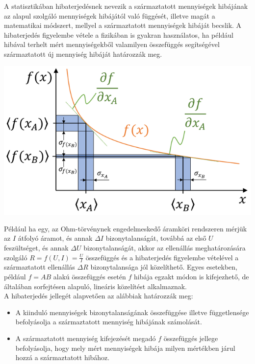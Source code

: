 \documentclass[11pt,a4paper]{article}
\begin{document}
  \begin{tcolorbox}[colback=MidnightBlue!5!white,colframe=MidnightBlue!60!black,title= Hibaterjedés]
    \begin{multicols*}{2}
        A statisztikában hibaterjedésnek nevezik a származtatott mennyiségek hibájának az alapul szolgáló mennyiségek hibájától való függését, illetve magát a matematikai módszert, mellyel a származtatott mennyiségek hibáját becslik. A hibaterjedés figyelembe vétele a fizikában is gyakran használatos, ha például hibával terhelt mért mennyiségekből valamilyen összefüggés segítségével származtatott új mennyiség hibáját határozzák meg.
        \columnbreak
        \begin{center}
            \includegraphics*[width=.4\textwidth]{hibaterjedes.png}
        \end{center}
    \end{multicols*}
    Például ha egy, az Ohm-törvénynek engedelmeskedő áramköri rendszeren mérjük az $I$ átfolyó áramot, és annak $\Delta I$ bizonytalanságát, továbbá az első $U$ feszültséget, és annak $\Delta U$ bizonytalanságát, akkor az ellenállás meghatározására szolgáló $R=f(U,I)={\frac {U}{I}}$ összefüggés és a hibaterjedés figyelembe vételével a származtatott ellenállás $\Delta R$ bizonytalansága jól közelíthető. Egyes esetekben, például $f=AB$ alakú összefüggés esetén $f$ hibája egzakt módon is kifejezhető, de általában sorfejtésen alapuló, lineáris közelítést alkalmaznak.\\
    A hibaterjedés jellegét alapvetően az alábbiak határozzák meg:
    \begin{itemize}
        \item A kiinduló mennyiségek bizonytalanságának összefüggése illetve függetlensége befolyásolja a származtatott mennyiség hibájának számolását.
        \item A származtatott mennyiség kifejezését megadó $f$ összefüggés jellege befolyásolja, hogy mely mért mennyiségek hibája milyen mértékben járul hozzá a származtatott hibához.
    \end{itemize}
  \end{tcolorbox}
\end{document}
